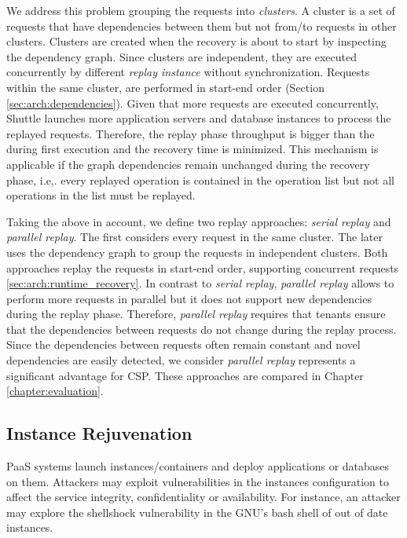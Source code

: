 We address this problem grouping the requests into \emph{clusters}. A cluster is a set of requests that have dependencies between them but not from/to requests in other clusters. Clusters are created when the recovery is about to start by inspecting the dependency graph. Since clusters are independent, they are executed concurrently by different \emph{replay instance} without synchronization. Requests within the same cluster, are performed in start-end order (Section \ref{sec:arch:dependencies}). Given that more requests are executed concurrently, Shuttle launches more application servers and database instances to process the replayed requests. Therefore, the replay phase throughput is bigger than the during first execution and the recovery time is minimized. This mechanism is applicable if the graph dependencies remain unchanged during the recovery phase, i.e,. every replayed operation is contained in the operation list but not all operations in the list must be replayed.

Taking the above in account, we define two replay approaches: \emph{serial replay} and \emph{parallel replay}. The first considers every request in the same cluster. The later uses the dependency graph to group the requests in independent clusters. Both approaches replay the requests in start-end order, supporting concurrent requests \ref{sec:arch:runtime_recovery}. In contrast to \emph{serial replay}, \emph{parallel replay} allows to perform more requests in parallel but it does not support new dependencies during the replay phase. Therefore, \emph{parallel replay} requires that tenants ensure that the dependencies between requests do not change during the replay process. Since the dependencies between requests often remain constant and novel dependencies are easily detected, we consider \emph{parallel replay} represents a significant advantage for \ac{CSP}. These approaches are compared in Chapter \ref{chapter:evaluation}.




\subsection{Instance Rejuvenation}
\label{sec:arch:image_rejuvenation}

\ac{PaaS} systems launch instances/containers and deploy applications or databases on them. Attackers may exploit vulnerabilities in the instances configuration to affect the service integrity, confidentiality or availability. For instance, an attacker may explore the shellshock vulnerability in the GNU's bash shell of out of date instances.

